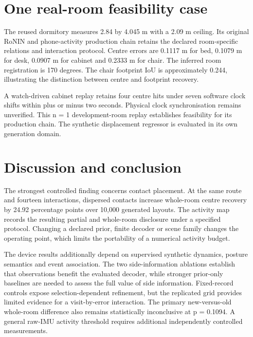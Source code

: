 \documentclass[10pt,twocolumn,letterpaper]{article}
\begin{document}
\section{One real-room feasibility
case}\label{one-real-room-feasibility-case}

The reused dormitory measures 2.84 by 4.045 m with a 2.09 m ceiling. Its
original RoNIN and phone-activity production chain retains the declared
room-specific relations and interaction protocol. Centre errors are
0.1117 m for bed, 0.1079 m for desk, 0.0907 m for cabinet and 0.2333 m
for chair. The inferred room registration is 170 degrees. The chair
footprint IoU is approximately 0.244, illustrating the distinction
between centre and footprint recovery.

A watch-driven cabinet replay retains four centre hits under seven
software clock shifts within plus or minus two seconds. Physical clock
synchronisation remains unverified. This n = 1 development-room replay
establishes feasibility for its production chain. The synthetic
displacement regressor is evaluated in its own generation domain.

\section{Discussion and conclusion}\label{discussion-and-conclusion}

The strongest controlled finding concerns contact placement. At the same
route and fourteen interactions, dispersed contacts increase whole-room
centre recovery by 24.92 percentage points over 10,000 generated
layouts. The activity map records the resulting partial and whole-room
disclosure under a specified protocol. Changing a declared prior, finite
decoder or scene family changes the operating point, which limits the
portability of a numerical activity budget.

The device results additionally depend on supervised synthetic dynamics,
posture semantics and event association. The two side-information
ablations establish that observations benefit the evaluated decoder,
while stronger prior-only baselines are needed to assess the full value
of side information. Fixed-record controls expose selection-dependent
refinement, but the replicated grid provides limited evidence for a
visit-by-error interaction. The primary new-versus-old whole-room
difference also remains statistically inconclusive at p = 0.1094. A
general raw-IMU activity threshold requires additional independently
controlled measurements.
\end{document}

